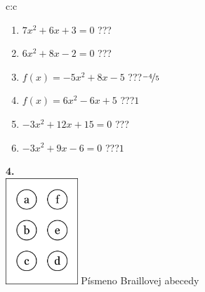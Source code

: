 \documentclass[10pt]{report}
\begin{document}
\begin{tabular}{c:c}
\begin{minipage}[c][104.5mm][t]{0.5\linewidth}
\begin{center}
\begin{minipage}{0.79\linewidth}
\begin{center}
\begin{varwidth}{\linewidth}
\begin{enumerate}
\Large
\item $7x^2+6x+3=0$\quad \dotfill\; ???\;\dotfill {}
\item $6x^2+8x-2=0$\quad \dotfill\; ???\;\dotfill {}
\item $f(x)=-5x^2+8x-5$\quad \dotfill\; ???\;\dotfill \quad $\nicefrac{-4}{5}$
\item $f(x)=6x^2-6x+5$\quad \dotfill\; ???\;\dotfill \quad $1$
\item $-3x^2+12x+15=0$\quad \dotfill\; ???\;\dotfill {}
\item $-3x^2+9x-6=0$\quad \dotfill\; ???\;\dotfill \quad $1$
\end{enumerate}
\end{varwidth}
\end{center}
\end{minipage}
\begin{minipage}{0.20\linewidth}
\begin{center}
{\Huge\bfseries 4.} \\[2mm]
\includegraphics[height=40mm]{../images/braille.png}
{\small Písmeno Braillovej abecedy}
\end{center}
\end{minipage}
\end{center}
\end{minipage}
%
\end{tabular}
\newpage
\thispagestyle{empty}
\end{document}
